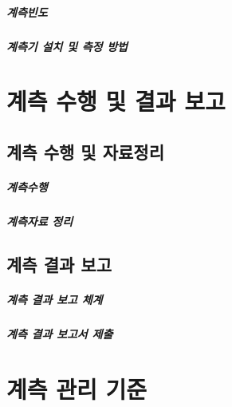 		\paragraph{계측빈도}
		
		\paragraph{계측기 설치 및 측정 방법}
		



	\chapter{계측 수행 및 결과 보고}
	\minitoc				%

	\section{계측 수행 및 자료정리}
	
		\paragraph{계측수행}
	
		\paragraph{계측자료 정리}

	\section{계측 결과 보고}
	
		\paragraph{계측 결과 보고 체계}
		
		\paragraph{계측 결과 보고서 제출}
		
		
	\chapter{계측 관리 기준}
	\minitoc				%
		
